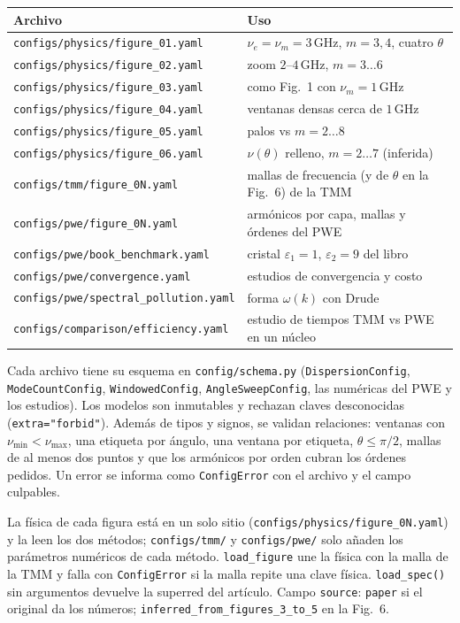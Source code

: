 \documentclass[11pt,a4paper]{article}
\begin{document}
\begin{center}
\begin{tabular}{ll}
\toprule
Archivo & Uso \\
\midrule
\texttt{configs/physics/figure\_01.yaml} & \(\nu_e=\nu_m=3\,\mathrm{GHz}\), \(m=3,4\), cuatro \(\theta\) \\
\texttt{configs/physics/figure\_02.yaml} & zoom \(2\)--\(4\,\mathrm{GHz}\), \(m=3\ldots 6\) \\
\texttt{configs/physics/figure\_03.yaml} & como Fig.~1 con \(\nu_m=1\,\mathrm{GHz}\) \\
\texttt{configs/physics/figure\_04.yaml} & ventanas densas cerca de \(1\,\mathrm{GHz}\) \\
\texttt{configs/physics/figure\_05.yaml} & palos vs \(m=2\ldots 8\) \\
\texttt{configs/physics/figure\_06.yaml} & \(\nu(\theta)\) relleno, \(m=2\ldots 7\) (inferida) \\
\texttt{configs/tmm/figure\_0N.yaml} & mallas de frecuencia (y de \(\theta\) en la Fig.~6) de la TMM \\
\texttt{configs/pwe/figure\_0N.yaml} & armónicos por capa, mallas y órdenes del PWE \\
\texttt{configs/pwe/book\_benchmark.yaml} & cristal \(\varepsilon_1=1\), \(\varepsilon_2=9\) del libro \\
\texttt{configs/pwe/convergence.yaml} & estudios de convergencia y costo \\
\texttt{configs/pwe/spectral\_pollution.yaml} & forma \(\omega(k)\) con Drude \\
\texttt{configs/comparison/efficiency.yaml} & estudio de tiempos TMM vs PWE en un núcleo \\
\bottomrule
\end{tabular}
\end{center}

Cada archivo tiene su esquema en \texttt{config/schema.py}
(\texttt{DispersionConfig}, \texttt{ModeCountConfig},
\texttt{WindowedConfig}, \texttt{AngleSweepConfig}, las numéricas del PWE y
los estudios). Los modelos son inmutables y rechazan claves desconocidas
(\texttt{extra="forbid"}). Además de tipos y signos, se validan relaciones:
ventanas con \(\nu_{\min}<\nu_{\max}\), una etiqueta por ángulo, una ventana
por etiqueta, \(\theta\le\pi/2\), mallas de al menos dos puntos y que los
armónicos por orden cubran los órdenes pedidos. Un error se informa como
\texttt{ConfigError} con el archivo y el campo culpables.

La física de cada figura está en un solo sitio
(\texttt{configs/physics/figure\_0N.yaml}) y la leen los dos métodos;
\texttt{configs/tmm/} y \texttt{configs/pwe/} solo añaden los parámetros
numéricos de cada método. \texttt{load\_figure} une la física con la malla de
la TMM y falla con \texttt{ConfigError} si la malla repite una clave física. \texttt{load\_spec()} sin argumentos devuelve la superred
del artículo. Campo \texttt{source}: \texttt{paper} si el original da los
números; \texttt{inferred\_from\_figures\_3\_to\_5} en la Fig.~6.
\end{document}
